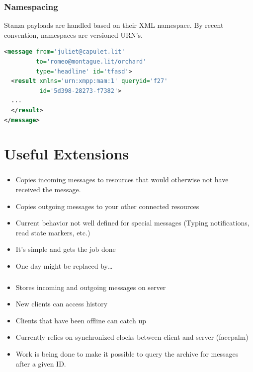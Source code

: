 \documentclass[xelatex,aspectratio=169]{beamer}
\begin{document}
\begin{frame}[fragile]
	\frametitle{Namespacing}
	\begin{flushleft}
		Stanza payloads are handled based on their XML namespace. By recent
		convention, namespaces are versioned URN's.
	\end{flushleft}
\begin{lstlisting}[frame=single,language=xml]
<message from='juliet@capulet.lit'
         to='romeo@montague.lit/orchard'
         type='headline' id='tfasd'>
  <result xmlns='urn:xmpp:mam:1' queryid='f27'
          id='5d398-28273-f7382'>
  ...
  </result>
</message>
\end{lstlisting}
\end{frame}

\section[]{Useful Extensions}
\frame{\sectionpage}

\begin{frame}
	\frametitle{}
	\begin{itemize}
		\item Copies incoming messages to resources that would otherwise not have received the message.
		\item Copies outgoing messages to your other connected resources
		\item Current behavior not well defined for special messages (Typing notifications, read state markers, etc.)
		\item It's simple and gets the job done
		\item One day might be replaced by\ldots
	\end{itemize}
\end{frame}

\begin{frame}
	\frametitle{}
	\begin{itemize}
		\item Stores incoming and outgoing messages on server
		\item New clients can access history
		\item Clients that have been offline can catch up
		\item Currently relies on synchronized clocks between client and server (facepalm)
		\item Work is being done to make it possible to query the archive for
			messages after a given ID.
	\end{itemize}
\end{frame}
\end{document}
